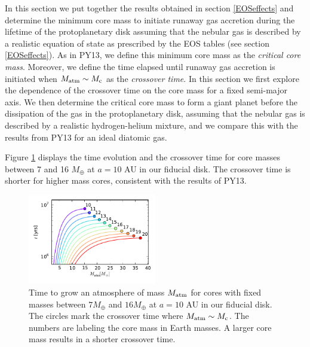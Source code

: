 \documentclass[apj]{emulateapj}
\newcommand{\co}{_{\rm c}}
\begin{document}


In this section we put together the results obtained in section \ref{EOSeffects} and determine the minimum core mass to initiate runaway gas accretion during the lifetime of the protoplanetary disk assuming that the nebular gas is described by a realistic equation of state as prescribed by the \citet{saumon95} EOS tables (see section \ref{EOSeffects}). As in PY13, we define this minimum core mass as the \textit{critical core mass}. Moreover, we define the time elapsed until runaway gas accretion is initiated when $M_{\rm{atm}} \sim M\co$ as the \textit{crossover time}. In this section we first explore the dependence of the crossover time on the core mass for a fixed semi-major axis. We then determine the critical core mass to form a giant planet before the dissipation of the gas in the protoplanetary disk, assuming that the nebular gas is described by a realistic hydrogen-helium mixture, and we compare this with the results from PY13 for an ideal diatomic gas. 



Figure \ref{fig:tvsMplot} displays the time evolution and the crossover time for core masses between 7 and 16 $M_{\oplus}$ at $a=10$ AU in our fiducial disk. The crossover time is shorter for higher mass cores, consistent with the results of PY13. 

\begin{figure}[h!]
\centering
\includegraphics[width=0.5\textwidth]{../../figs/ModelAtmospheres/RadSelfGravRealEOS/PaperFigs/t_vs_M_10au.pdf}
\caption{Time to grow an atmosphere of mass $M_{\rm{atm}}$ for cores with fixed masses between $7 M_{\oplus}$ and $16 M_{\oplus}$ at $a=10$ AU in our fiducial disk. The circles mark the crossover time where $M_{\rm{atm}} \sim M_{\rm c}$. The numbers are labeling the core mass in Earth masses. A larger core mass results in a shorter crossover time.}
\label{fig:tvsMplot}
\end{figure}
\end{document}
